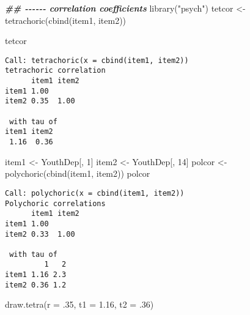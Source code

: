 \documentclass[
]{book}
\newenvironment{Shaded}{\begin{snugshade}}{\end{snugshade}}
\newcommand{\AttributeTok}[1]{\textcolor[rgb]{0.77,0.63,0.00}{#1}}
\newcommand{\DecValTok}[1]{\textcolor[rgb]{0.00,0.00,0.81}{#1}}
\newcommand{\DocumentationTok}[1]{\textcolor[rgb]{0.56,0.35,0.01}{\textbf{\textit{#1}}}}
\newcommand{\FloatTok}[1]{\textcolor[rgb]{0.00,0.00,0.81}{#1}}
\newcommand{\FunctionTok}[1]{\textcolor[rgb]{0.00,0.00,0.00}{#1}}
\newcommand{\NormalTok}[1]{#1}
\newcommand{\OtherTok}[1]{\textcolor[rgb]{0.56,0.35,0.01}{#1}}
\newcommand{\StringTok}[1]{\textcolor[rgb]{0.31,0.60,0.02}{#1}}
\begin{document}
\begin{Shaded}
\begin{Highlighting}[]
\DocumentationTok{\#\# {-}{-}{-}{-}{-}{-} correlation coefficients}
\FunctionTok{library}\NormalTok{(}\StringTok{"psych"}\NormalTok{)}
\NormalTok{tetcor }\OtherTok{\textless{}{-}} \FunctionTok{tetrachoric}\NormalTok{(}\FunctionTok{cbind}\NormalTok{(item1, item2))}
\end{Highlighting}
\end{Shaded}

\begin{Shaded}
\begin{Highlighting}[]
\NormalTok{tetcor}
\end{Highlighting}
\end{Shaded}

\begin{verbatim}
Call: tetrachoric(x = cbind(item1, item2))
tetrachoric correlation 
      item1 item2
item1 1.00       
item2 0.35  1.00 

 with tau of 
item1 item2 
 1.16  0.36 
\end{verbatim}

\begin{Shaded}
\begin{Highlighting}[]
\NormalTok{item1 }\OtherTok{\textless{}{-}}\NormalTok{ YouthDep[, }\DecValTok{1}\NormalTok{]}
\NormalTok{item2 }\OtherTok{\textless{}{-}}\NormalTok{ YouthDep[, }\DecValTok{14}\NormalTok{]}
\NormalTok{polcor }\OtherTok{\textless{}{-}} \FunctionTok{polychoric}\NormalTok{(}\FunctionTok{cbind}\NormalTok{(item1, item2))}
\NormalTok{polcor}
\end{Highlighting}
\end{Shaded}

\begin{verbatim}
Call: polychoric(x = cbind(item1, item2))
Polychoric correlations 
      item1 item2
item1 1.00       
item2 0.33  1.00 

 with tau of 
         1   2
item1 1.16 2.3
item2 0.36 1.2
\end{verbatim}

\begin{Shaded}
\begin{Highlighting}[]
\FunctionTok{draw.tetra}\NormalTok{(}\AttributeTok{r =}\NormalTok{ .}\DecValTok{35}\NormalTok{, }\AttributeTok{t1 =} \FloatTok{1.16}\NormalTok{, }\AttributeTok{t2 =}\NormalTok{ .}\DecValTok{36}\NormalTok{)}
\end{Highlighting}
\end{Shaded}
\end{document}

